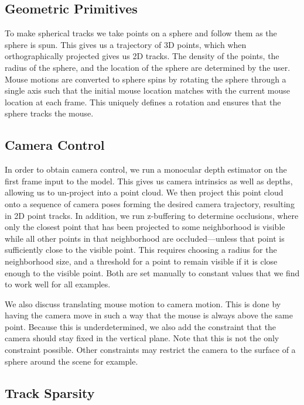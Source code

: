 \subsection{Geometric Primitives}

To make spherical tracks we take points on a sphere and follow them as the sphere is spun. This gives us a trajectory of 3D points, which when orthographically projected gives us 2D tracks. The density of the points, the radius of the sphere, and the location of the sphere are determined by the user. Mouse motions are converted to sphere spins by rotating the sphere through a single axis such that the initial mouse location matches with the current mouse location at each frame. This uniquely defines a rotation and ensures that the sphere tracks the mouse.

\subsection{Camera Control}
In order to obtain camera control, we run a monocular depth estimator on the first frame input to the model. This gives us camera intrinsics as well as depths, allowing us to un-project into a point cloud. We then project this point cloud onto a sequence of camera poses forming the desired camera trajectory, resulting in 2D point tracks. In addition, we run z-buffering to determine occlusions, where only the closest point that has been projected to some neighborhood is visible while all other points in that neighborhood are occluded---unless that point is sufficiently close to the visible point. This requires choosing a radius for the neighborhood size, and a threshold for a point to remain visible if it is close enough to the visible point. Both are set manually to constant values that we find to work well for all examples.

We also discuss translating mouse motion to camera motion. This is done by having the camera move in such a way that the mouse is always above the same point. Because this is underdetermined, we also add the constraint that the camera should stay fixed in the vertical plane. Note that this is not the only constraint possible. Other constraints may restrict the camera to the surface of a sphere around the scene for example.

\subsection{Track Sparsity}

